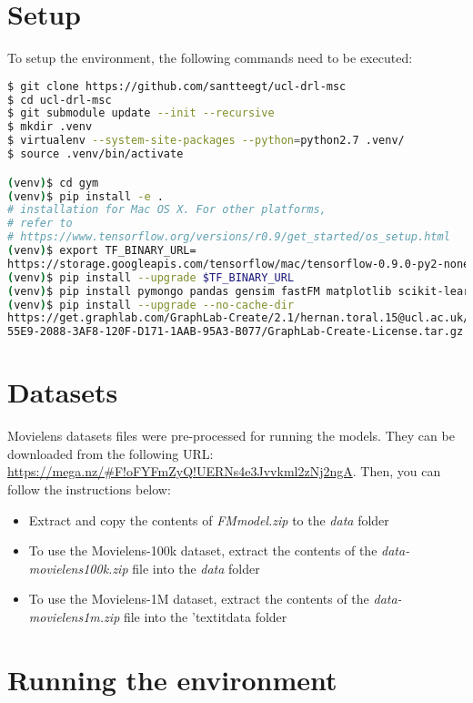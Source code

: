 \section{Setup}

To setup the environment, the following commands need to be executed:

\begin{lstlisting}[language=bash]
$ git clone https://github.com/santteegt/ucl-drl-msc
$ cd ucl-drl-msc
$ git submodule update --init --recursive
$ mkdir .venv
$ virtualenv --system-site-packages --python=python2.7 .venv/
$ source .venv/bin/activate

(venv)$ cd gym
(venv)$ pip install -e .
# installation for Mac OS X. For other platforms, 
# refer to 
# https://www.tensorflow.org/versions/r0.9/get_started/os_setup.html
(venv)$ export TF_BINARY_URL=
https://storage.googleapis.com/tensorflow/mac/tensorflow-0.9.0-py2-none-any.whl
(venv)$ pip install --upgrade $TF_BINARY_URL
(venv)$ pip install pymongo pandas gensim fastFM matplotlib scikit-learn scipy
(venv)$ pip install --upgrade --no-cache-dir 
https://get.graphlab.com/GraphLab-Create/2.1/hernan.toral.15@ucl.ac.uk/
55E9-2088-3AF8-120F-D171-1AAB-95A3-B077/GraphLab-Create-License.tar.gz
\end{lstlisting}

\section{Datasets}

Movielens datasets files were pre-processed for running the models. They can be downloaded from the following URL: \url{https://mega.nz/#F!oFYFmZyQ!UERNs4e3Jvvkml2zNj2ngA}. Then, you can follow the instructions below:

\begin{itemize}
\item Extract and copy the contents of \textit{FMmodel.zip} to the \textit{data} folder
\item To use the Movielens-100k dataset, extract the contents of the \textit{data-movielens100k.zip} file into the \textit{data} folder
\item To use the Movielens-1M dataset, extract the contents of the \textit{data-movielens1m.zip} file into the 'textit{data} folder
\end{itemize}

\section{Running the environment}

